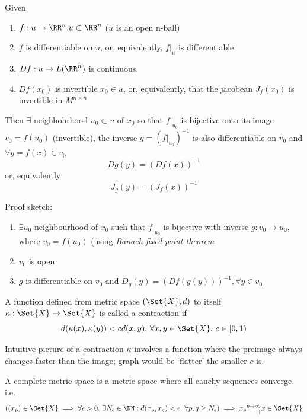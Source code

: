 \begin{thm}
  Given
  \begin{enumerate}
  \item $f: u \rightarrow \RR^n. u \subset \RR^n$ ($u$ is an open n-ball)
  \item $f$ is differentiable on $u$, or, equivalently, $f|_u$ is differentiable
  \item $Df: u \rightarrow L(\RR^n)$ is continuous.
  \item $Df(x_0)$ is invertible $x_0 \in u$, or, equivalently, that the jacobean $J_f(x_0)$ is invertible in $M^{n\times n}$
  \end{enumerate}
  Then $\exists$ neighbohrhood $u_0 \subset u$ of $x_0$ so that $f|_{u_0}$ is bijective onto its image $v_0 = f(u_0)$ (invertible), the inverse $g = (f|_{u_0})^{-1}$ is also differentiable on $v_0$ and $\forall y = f(x) \in v_0$
  $$Dg(y) = (Df(x))^{-1}$$
  or, equivalently
  $$J_g(y) = (J_f(x))^{-1}$$
\end{thm}

Proof sketch:
\begin{enumerate}[I]
\item $\exists u_0$ neighbourhood of $x_0$ such that $f|_{u_0}$ is bijective with inverse $g: v_0 \rightarrow u_0$, where $v_0 = f(u_0)$ (using \emph{Banach fixed point theorem}
\item $v_0$ is open
\item $g$ is differentiable on $v_0$ and $D_g(y) = (Df(g(y)))^{-1}, \forall y \in v_0$
\end{enumerate}

\begin{defn}
  A function defined from metric space $(\Set{X}, d)$ to itself $\kappa: \Set{X} \rightarrow \Set{X}$ is called a contraction if
  $$d(\kappa(x), \kappa(y)) < cd(x,y).\ \forall x, y \in \Set{X}.\ c \in [0, 1)$$
\end{defn}

\begin{rem}
  Intuitive picture of a contraction $\kappa$ involves  a function where the preimage always changes faster than the image; graph would be `flatter' the smaller $c$ is.
\end{rem}

\begin{ldefn}
  A complete metric space is a metric space where all cauchy sequences converge. i.e. $$((x_p) \in \Set{X} \implies \forall \epsilon > 0 . \ \exists N_\epsilon \in \NN : d(x_p, x_q) < \epsilon .\  \forall p, q \geq N_\epsilon) \implies x_p \underrightarrow{^{p\rightarrow \infty}} x \in \Set{X} $$
\end{ldefn}

